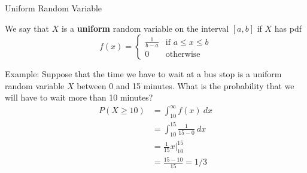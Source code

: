 \documentclass[handout]{beamer}
\renewcommand{\emph}{\textbf}
\begin{document}
\begin{frame}{Uniform Random Variable}
\begin{block}{}
We say that $X$ is a \emph{uniform} random variable on the interval $[a,b]$ if $X$ has pdf
$$f(x)=\begin{cases}\frac1{b-a} & \text{if }a\leq x\leq b \\
0 & \text{otherwise}\end{cases}$$
\end{block}
\pause Example: Suppose that the time we have to wait at a bus stop is a uniform random variable $X$ between 0 and 15 minutes. What is the probability that we will have to wait more than 10 minutes?
\pause \begin{align*}
P(X\geq 10) &= \int_{10}^\infty f(x)\ dx \\
&= \int_{10}^{15} \frac1{15-0}\ dx \\
&= \frac1{15}x\big\vert_{10}^{15} \\
&= \frac{15-10}{15} = 1/3
\end{align*}
\end{frame}
\end{document}
